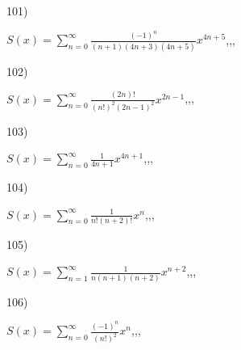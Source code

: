 \documentclass[11pt, ukrainian]{article}
\begin{document}
\par
\vspace{0.9cm}
101) \space 
{%
{$S(x)=\sum\limits_{n=0}^{\infty}{\frac{(-1)^n}{(n+1)(4n+3)(4n+5)}}{x^{{4n+5}}}$},,, \par \smallskip  
}
\par
\vspace{0.9cm}
102) \space 
{%
{$S(x)=\sum\limits_{n=0}^{\infty}{\frac{(2n)!}{{(n!)^2}{(2n-1)^2}}}{x^{{2n-1}}}$},,, \par \smallskip  
}
\par
\vspace{0.9cm}
103) \space 
{%
{$S(x)=\sum\limits_{n=0}^{\infty}{\frac{1}{4n+1}}{x^{{4n+1}}}$},,, \par \smallskip  
}
\par
\vspace{0.9cm}
104) \space 
{%
{$S(x)=\sum\limits_{n=0}^{\infty}{\frac{1}{n!(n+2)!}}{x^{{n}}}$},,, \par \smallskip  
}
\par
\newpage
105) \space 
{%
{$S(x)=\sum\limits_{n=1}^{\infty}{\frac{1}{n(n+1)(n+2)}}{x^{{n+2}}}$},,, \par \smallskip  
}
\par
\vspace{0.9cm}
106) \space 
{%
{$S(x)=\sum\limits_{n=0}^{\infty}{\frac{(-1)^n}{(n!)^2}}{x^{{n}}}$},,, \par \smallskip  
}
\end{document}

